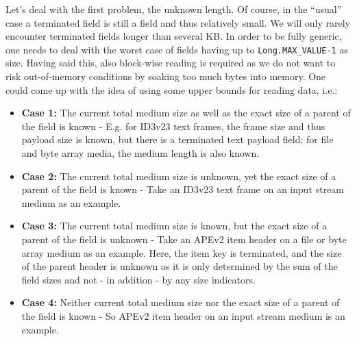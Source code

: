 Let's deal with the first problem, the unknown length. Of course, in the ``usual'' case a terminated field is still a field and thus relatively small. We will only rarely encounter terminated fields longer than several KB. In order to be fully generic, one needs to deal with the worst case of fields having up to \texttt{Long.MAX\_VALUE-1} as size. Having said this, also block-wise reading is required as we do not want to risk out-of-memory conditions by soaking too much bytes into memory. One could come up with the idea of using some upper bounds for reading data, i.e.:
\begin{itemize}
\item \textbf{Case 1:} The current total medium size as well as the exact size of a parent of the field is known - E.g. for ID3v23 text frames, the frame size and thus payload size is known, but there is a terminated text payload field; for file and byte array media, the medium length is also known.
\item \textbf{Case 2:} The current total medium size is unknown, yet the exact size of a parent of the field is known - Take an ID3v23 text frame on an input stream medium as an example.
\item \textbf{Case 3:} The current total medium size is known, but the exact size of a parent of the field is unknown - Take an APEv2 item header on a file or byte array medium as an example. Here, the item key is terminated, and the size of the parent header is unknown as it is only determined by the sum of the field sizes and not - in addition - by any size indicators.
\item \textbf{Case 4:} Neither current total medium size nor the exact size of a parent of the field is known - So APEv2 item header on an input stream medium is an example.
\end{itemize}

